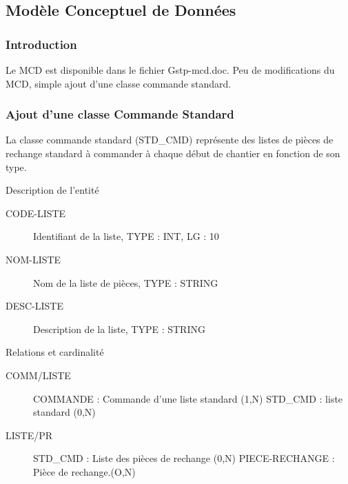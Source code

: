 \subsection{Modèle Conceptuel de Données}

\subsubsection{Introduction}
Le MCD est disponible dans le fichier Gstp-mcd.doc.
Peu de modifications du MCD, simple ajout d'une classe commande standard.


\subsubsection{Ajout d'une classe Commande Standard}

La classe commande standard (STD\_CMD) représente des listes de pièces de 
rechange standard à commander à chaque début de chantier en fonction de son type.

\par{Description de l'entité}
\begin{description}
    \item[CODE-LISTE] Identifiant de la liste, TYPE : INT, LG : 10
    \item[NOM-LISTE] Nom de la liste de pièces, TYPE : STRING
    \item[DESC-LISTE] Description de la liste, TYPE : STRING
\end{description}

\par{Relations et cardinalité}
\begin{description}
    \item[COMM/LISTE] COMMANDE : Commande d'une liste standard (1,N)\el
        STD\_CMD : liste standard (0,N)
    \item[LISTE/PR] STD\_CMD : Liste des pièces de rechange (0,N)\el
        PIECE-RECHANGE :  Pièce de rechange.(O,N)
\end{description}

